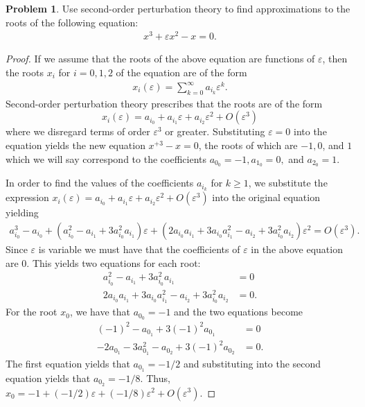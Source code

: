 \documentclass[12pt]{article}
\theoremstyle{definition}
\newtheorem{problem}{Problem}
\begin{document}
\begin{problem}
  Use second-order perturbation theory to find approximations to the roots of the following equation:
  \begin{align*}
    x^3 + \varepsilon x^2 - x = 0.
  \end{align*}
\end{problem}

\begin{proof}
  If we assume that the roots of the above equation are functions of $\varepsilon$,
  then the roots $x_i$ for $i=0,1,2$ of the equation are of the form
  \begin{align*}
    x_i(\varepsilon) = \sum_{k=0}^\infty a_{i_k} \varepsilon ^k.
  \end{align*}
  Second-order perturbation theory prescribes that the roots are of the form
  $$x_i(\varepsilon) = a_{i_0} + a_{i_1} \varepsilon + a_{i_2} \varepsilon^2 + O(\varepsilon^3)$$
  where we disregard terms of order $\varepsilon^3$ or greater. Substituting $\varepsilon = 0$
  into the equation yields the new equation $x^{+3} -x = 0$, the roots of which are $-1, 0$, and $1$
  which we will say correspond to the coefficients $a_{0_0} = -1, a_{1_0} = 0, $ and $a_{2_0} = 1$.

  In order to find the values of the coefficients $a_{i_k}$ for $k \geq 1$, we substitute the expression
  $x_i(\varepsilon) = a_{i_0} + a_{i_1} \varepsilon + a_{i_2} \varepsilon^2 + O(\varepsilon^3)$ into the original equation
  yielding
  \begin{align*}
    a_{i_0}^3-a_{i_0} + (a_{i_0}^2  -a_{i_1} + 3a_{i_0}^2a_{i_1})\varepsilon + (2a_{i_0}a_{i_1} + 3a_{i_0}a_{i_1}^2 - a_{i_2} + 3a_{i_0}^2a_{i_2})\varepsilon^2 = O(\varepsilon^3).
  \end{align*}
  Since $\varepsilon$ is variable we must have that the coefficients of $\varepsilon$ in the above equation are 0.
  This yields two equations for each root:
  \begin{align*}
    a_{i_0}^2  -a_{i_1} + 3a_{i_0}^2a_{i_1} &= 0 \\
    2a_{i_0}a_{i_1} + 3a_{i_0}a_{i_1}^2 - a_{i_2} + 3a_{i_0}^2a_{i_2} &= 0.
  \end{align*}
  For the root $x_0$, we have that $a_{0_0} = -1$ and the two equations become
  \begin{align*}
    (-1)^2  -a_{0_1} + 3(-1)^2a_{0_1} &= 0 \\
    -2a_{0_1} - 3a_{0_1}^2 - a_{0_2} + 3(-1)^2a_{0_2} &= 0.
  \end{align*}
  The first equation yields that $a_{0_1} = -1/2$ and substituting into the second
  equation yields that $a_{0_2} = -1/8$. Thus, $x_0 = -1 + (-1/2)\varepsilon + (-1/8)\varepsilon^2 + O(\varepsilon^3)$.


\end{proof}
\end{document}
